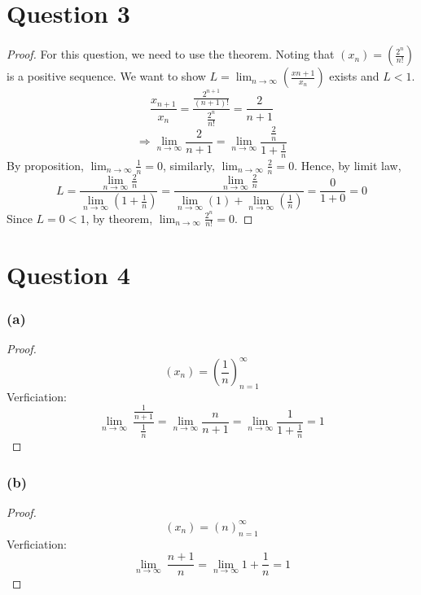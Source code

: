 \documentclass{article}
\begin{document}
\section*{Question 3}
\begin{proof}
    For this question, we need to use the theorem. Noting that \( (x_n) = (\frac{2^n}{n!}) \) is a positive sequence.
    We want to show \( L = \lim_{n \rightarrow \infty} (\frac{x{n + 1}}{x_n}) \) exists and $L < 1$.
    \\
    \[ \frac{x_{n+1}}{x_n} = \frac{\frac{2^{n+1}}{(n+1)!}}{\frac{2^n}{n!}} = \frac{2}{n + 1} \]
    \[ \Rightarrow \lim_{n \rightarrow \infty} \frac{2}{n + 1}  = \lim_{n \rightarrow \infty} \frac{\frac{2}{n}}{1 + \frac{1}{n}} \]
    By proposition, \( \lim_{n \rightarrow \infty} \frac{1}{n} = 0 \), similarly, \( \lim_{n \rightarrow \infty} \frac{2}{n} = 0 \). Hence, by limit law,
    \[ L = \frac{\lim_{n \rightarrow \infty} \frac{2}{n}}{\lim_{n \rightarrow \infty} (1 + \frac{1}{n})} = \frac{\lim_{n \rightarrow \infty} \frac{2}{n}}{\lim_{n \rightarrow \infty} (1) + \lim_{n \rightarrow \infty} (\frac{1}{n})} = \frac{0}{1 + 0} = 0 \]
    Since $L = 0 < 1$, by theorem, \(\lim_{n \rightarrow \infty} \frac{2^n}{n!} = 0\).
\end{proof}

\section*{Question 4}

\subsubsection{(a)}
\begin{proof}
    \[ (x_n) = (\frac{1}{n})_{n=1}^{\infty} \]
    Verficiation:
    \[ \lim_{n \rightarrow \infty} \ \frac{\frac{1}{n+1}}{\frac{1}{n}} = \lim_{n \rightarrow \infty} \frac{n}{n + 1} = \lim_{n \rightarrow \infty} \frac{1}{1 + \frac{1}{n}} = 1 \]
\end{proof}

\subsubsection{(b)}
\begin{proof}
    \[ (x_n) = (n)_{n=1}^{\infty} \]
    Verficiation:
    \[ \lim_{n \rightarrow \infty} \ \frac{n+1}{n} = \lim_{n \rightarrow \infty} 1 + \frac{1}{n} = 1 \]
\end{proof}
\end{document}
